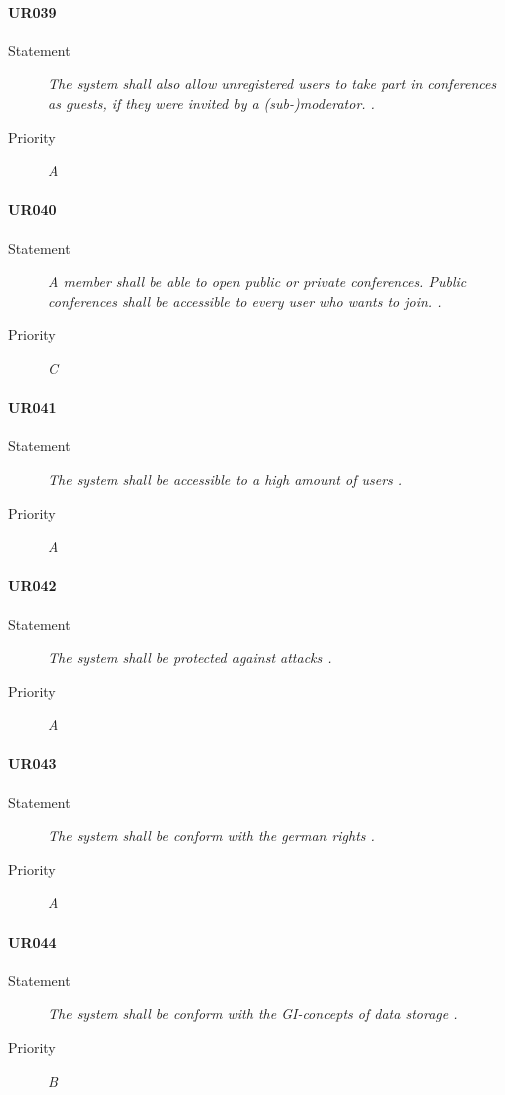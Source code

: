 \paragraph{UR039}
  \begin{description}
  \item [Statement] 
    \textit{ The system shall also allow unregistered users to take part in conferences as guests,
            if they were invited by a (sub-)moderator.
    .}
  \item [Priority] \textit{A}
\end{description}

\paragraph{UR040}
  \begin{description}
  \item [Statement] 
    \textit{ A member shall be able to open public or private conferences.
            Public conferences shall be accessible to every user who wants to join.
    .}
  \item [Priority] \textit{C}
\end{description}
    
\paragraph{UR041}
  \begin{description}
  \item [Statement] 
    \textit{ The system shall be accessible to a high amount of users
    .}
  \item [Priority] \textit{A}
\end{description}
    
\paragraph{UR042}
  \begin{description}
  \item [Statement] 
    \textit{ The system shall be protected against attacks
    .}
  \item [Priority] \textit{A}
\end{description}
    
\paragraph{UR043}
  \begin{description}
  \item [Statement] 
    \textit{ The system shall be conform with the german rights
    .}
  \item [Priority] \textit{A}
\end{description}
    
\paragraph{UR044}
  \begin{description}
  \item [Statement] 
    \textit{ The system shall be conform with the GI-concepts of data storage
    .}
  \item [Priority] \textit{B}
\end{description}
